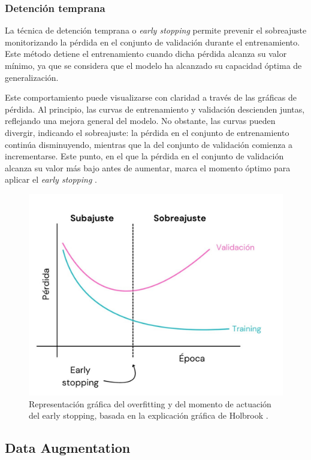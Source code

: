 \subsubsection{Detención temprana}
La técnica de detención temprana o \textit{early stopping} permite prevenir el sobreajuste monitorizando la pérdida en el conjunto de validación durante el entrenamiento. Este método detiene el entrenamiento cuando dicha pérdida alcanza su valor mínimo, ya que se considera que el modelo ha alcanzado su capacidad óptima de generalización. 

Este comportamiento puede visualizarse con claridad a través de las gráficas de pérdida. Al principio, las curvas de entrenamiento y validación descienden juntas, reflejando una mejora general del modelo. No obstante, las curvas pueden divergir, indicando el sobreajuste: la pérdida en el conjunto de entrenamiento continúa disminuyendo, mientras que la del conjunto de validación comienza a incrementarse. Este punto, en el que la pérdida en el conjunto de validación alcanza su valor más bajo antes de aumentar, marca el momento óptimo para aplicar el \textit{early stopping} \cite{ying2019overfitting}.

\begin{figure}[h]
    \centering
    \includegraphics[width= 0.8 \textwidth]{img/early_stopping_grafico.jpeg}
    \caption{Representación gráfica del overfitting y del momento de actuación del early stopping, basada en la explicación gráfica de Holbrook \cite{holbrook2021overfitting}.}
    \label{fig:grafico_overfitting}
\end{figure}

\subsection{Data Augmentation}

